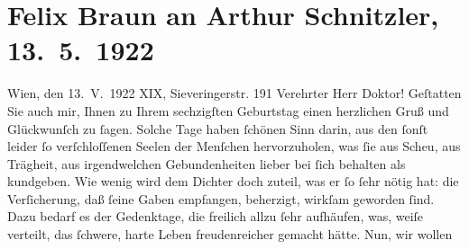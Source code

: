 

         \renewcommand{\erwaehnteOrte}{Orte: Sieveringer Straße, Wien}
         \renewcommand{\erwaehnteWerke}{}
               \section[Felix Braun an Arthur Schnitzler, 13. 5. 1922]{ Felix Braun an Arthur Schnitzler, 13. 5. 1922}\nopagebreak{}\rehead{ }\begin{ledgroupsized}[t]{13cm}\normalsize\beginnumbering \toendnotes[C]{\smallbreak\pagebreak[2]} 
\toendnotes[C]{\smallbreak}\pstart
           \raggedleft{}{\pb}Wien, den 13. V. 1922\pend
           \pstart
           \raggedleft{}XIX, Sieveringerstr. 191\pend
           \pstart{}Verehrter Herr Doktor!\pend\pstart
           Geſtatten Sie auch mir, Ihnen zu Ihrem sechzigſten Geburtstag einen herzlichen
                    Gruß und Glückwunſch zu ſagen. Solche Tage haben \label{T_L02381_1v}\label{T_L02381_1h} ſchönen Sinn darin, aus den ſonſt leider
                    ſo verſchloſſenen Seelen der Menſchen hervorzuholen, was ſie aus Scheu, aus
                    Trägheit, aus irgendwelchen Gebundenheiten lieber bei ſich behalten als
                    kundgeben. Wie wenig wird dem Dichter doch zuteil, was er ſo ſehr nötig hat: die
                    Verſicherung, daß ſeine Gaben empfangen, beherzigt, wirkſam geworden ſind. Dazu
                    bedarf es der Gedenktage, die freilich allzu ſehr aufhäufen, was, weiſe
                    verteilt, das ſchwere, harte Leben freudenreicher gemacht hätte. Nun, wir wollen

\end{ledgroupsized}
